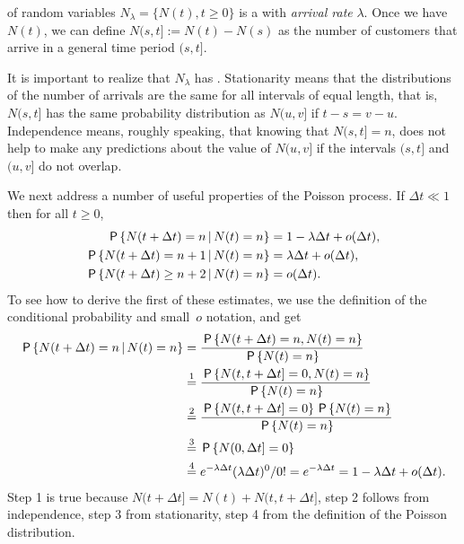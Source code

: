 \documentclass[stochastic-or.tex]{subfiles}
\begin{document}
 of random variables $N_\lambda=\{N(t), t\geq 0\}$ is a  with \emph{arrival rate} $\lambda$.
Once we have $N(t)$, we can define $N(s, t] := N(t)-N(s)$ as the number of customers that arrive in a general time period $(s, t]$.\sidenote{Note that $[0,t]$ is closed at both ends, but $(s,t]$ is open at the left.}

It is important to realize that  $N_\lambda$ has .
Stationarity means that the distributions of the number of arrivals are the same for all intervals of equal length, that is,
$N(s,t]$ has the same probability distribution as $N(u, v]$ if $t-s = v-u$.
Independence means, roughly speaking, that knowing that $N(s,t]= n$, does not help to make any predictions about the value of $N(u, v]$ if the intervals $(s,t]$ and $(u, v]$ do not overlap.

We next address a number of useful properties of the Poisson process.
If $\Delta t\ll 1$ then for all $t\geq 0$,
\begin{subequations}\label{eq:32}
\begin{align}
\,\mathsf{P}\left\{N(t+\Delta t) = n \,\middle|\, N(t) = n\right\} &= 1-\lambda \Delta t + o(\Delta t),  \\
\,\mathsf{P}\left\{N(t+\Delta t) = n+1 \,\middle|\, N(t) = n\right\} &= \lambda \Delta t + o(\Delta t), \label{eq:8} \\
\,\mathsf{P}\left\{N(t+\Delta t) \geq n+2 \,\middle|\, N(t) = n\right\} &= o(\Delta t).\label{eq:10}
\end{align}
\end{subequations}
To see how to derive the first of these estimates,  we use the definition of the conditional probability and small~$o$ notation, and get
 \begin{align*}
 \,\mathsf{P}\left\{N(t+\Delta t) = n \,\middle|\, N(t) = n\right\}
&= \frac{\,\mathsf{P}\left\{N(t+\Delta t) = n, N(t) = n\right\}}{\,\mathsf{P}\left\{N(t)=n\right\}} \\
&\stackrel1= \frac{\,\mathsf{P}\left\{N(t, t+\Delta t] = 0, N(t) = n\right\}}{\,\mathsf{P}\left\{N(t)=n\right\}} \\
&\stackrel2= \frac{\,\mathsf{P}\left\{N(t, t+\Delta t] = 0\right\} \,\mathsf{P}\left\{N(t) = n\right\}}{\,\mathsf{P}\left\{N(t)=n\right\}} \\
&\stackrel3= \,\mathsf{P}\left\{N(0, \Delta t] = 0\right\} \\
&\stackrel4= e^{-\lambda \Delta t} (\lambda \Delta t)^0/0!
= e^{-\lambda \Delta t} = 1-\lambda \Delta t + o(\Delta t).
 \end{align*}
Step 1 is true because $N(t+\Delta t]= N(t) + N(t, t+\Delta t]$, step 2 follows from independence, step 3 from stationarity, step 4 from the definition of the Poisson distribution.
\end{document}
